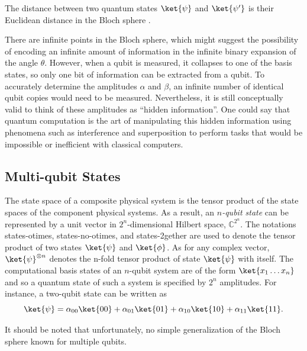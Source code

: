 The distance between two quantum states $\ket{\psi}$ and $\ket{\psi'}$ is their Euclidean distance in the Bloch sphere \cite{wallman2016noise,nielsen2010quantum}. 

There are infinite points in the Bloch sphere, which might suggest the possibility of encoding an infinite amount of information in the infinite binary expansion of the angle $\theta$. However, when a qubit is measured, it collapses to one of the basis states, so only one bit of information can be extracted from a qubit. To accurately determine the amplitudes $\alpha$ and $\beta$, an infinite number of identical qubit copies would need to be measured. Nevertheless, it is still conceptually valid to think of these amplitudes as ``hidden information''. One could say that quantum computation is the art of manipulating this hidden information using phenomena such as interference and superposition to perform tasks that would be impossible or inefficient with classical computers.



\subsection{Multi-qubit States} \label{subsec:entanglement}

\begin{definition}
 The state space of a composite physical system is the tensor product of the state spaces of the component physical systems. As a result, an $n$\emph{-qubit state} can be represented by a unit vector in $2^n$-dimensional Hilbert space, $\mathbb{C}^{2^{n}}$. The notations \gls{states-otimes}, \gls{states-no-otimes}, and \gls{states-2gether} are  used to denote the tensor product of two states $\ket{\psi}$ and $\ket{\phi}$. As for any complex vector, $\ket{\psi}^{\otimes n}$ denotes the n-fold tensor product of state $\ket{\psi}$ with itself. The computational basis states of an $n$-qubit system are of the form $\ket{x_{1}\ldots x_{n}}$ and so a quantum state of such a system is specified by $2^{n}$ amplitudes. For instance, a two-qubit state can be written as
\begin{equation*}
  \ket{\psi} = \alpha_{00}\ket{00} + \alpha_{01}\ket{01} + \alpha_{10}\ket{10} + \alpha_{11}\ket{11}.
\end{equation*}
\end{definition}
It should be noted that unfortunately, no simple generalization of the Bloch sphere known for multiple qubits.

